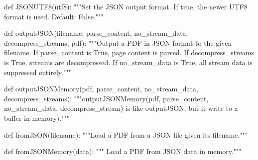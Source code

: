 def JSONUTF8(utf8):
    """Set the JSON output format. If true, the newer UTF8 format is used.
    Default: False."""

def outputJSON(filename, parse_content, no_stream_data, decompress_streams, pdf):
    """Output a PDF in JSON format to the given filename. If parse_content is
    True, page content is parsed. If decompress_streams is True, streams are
    decompressed. If no_stream_data is True, all stream data is suppressed
    entirely."""

def outputJSONMemory(pdf, parse_content, no_stream_data, decompress_streams):
    """outputJSONMemory(pdf, parse_content, no_stream_data, decompress_stream)
    is like outputJSON, but it write to a buffer in memory)."""

def fromJSON(filename):
    """Load a PDF from a JSON file given its filename."""

def fromJSONMemory(data):
    """ Load a PDF from JSON data in memory."""
